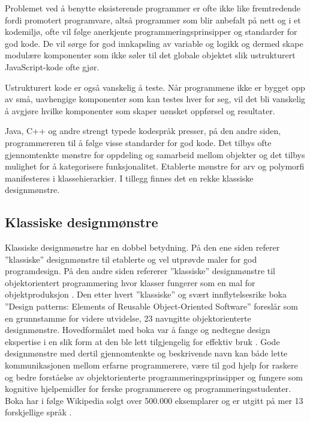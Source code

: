 \documentclass[norsk]{article}
\begin{document}
Problemet ved å benytte eksisterende programmer er ofte ikke like fremtredende fordi promotert programvare, altså programmer som blir anbefalt på nett og i et kodemiljø, ofte vil følge anerkjente programmeringsprinsipper og standarder for god kode. De vil sørge for god innkapsling av variable og logikk og dermed skape modulære komponenter som ikke søler til det globale objektet slik ustrukturert JavaScript-kode ofte gjør. 

Ustrukturert kode er også vanskelig å teste. Når programmene ikke er bygget opp av små, uavhengige komponenter som kan testes hver for seg, vil det bli vanskelig å avgjøre hvilke komponenter som skaper uønsket oppførsel og resultater. 

Java, C++ og andre strengt typede kodespråk presser, på den andre siden, programmereren til å følge visse standarder for god kode. Det tilbys ofte gjennomtenkte mønstre for oppdeling og samarbeid mellom objekter og det tilbys mulighet for å kategorisere funksjonalitet. Etablerte mønstre for arv og polymorfi manifesteres i klassehierarkier. I tillegg finnes det en rekke klassiske designmønstre. 
\subsection{Klassiske designmønstre}
Klassiske designmønstre har en dobbel betydning. På den ene siden referer ”klassiske” designmønstre til etablerte og vel utprøvde maler for god programdesign\parencite[s. 12]{gamma}. På den andre siden refererer ”klassiske” designmønstre til objektorientert programmering hvor klasser fungerer som en mal for objektproduksjon \parencite[s. 115]{stefanov}. Den etter hvert ”klassiske” og svært innflytelsesrike boka ”Design patterns: Elements of Reusable Object-Oriented Software” foreslår som en grunnstamme for videre utvidelse, 23 navngitte objektorienterte designmønstre. Hovedformålet med boka var å fange og nedtegne design ekspertise i en slik form at den ble lett tilgjengelig for effektiv bruk \parencite[s. 12]{gamma}. Gode designmønstre med dertil gjennomtenkte og beskrivende navn kan både lette kommunikasjonen mellom erfarne programmerere, være til god hjelp for raskere og bedre forståelse av objektorienterte programmeringsprinsipper og fungere som kognitive hjelpemidler for ferske programmerere og programmeringsstudenter. Boka har i følge Wikipedia solgt over 500.000 eksemplarer og er utgitt på mer 13 forskjellige språk \parencite{wikiDP}. 
\end{document}
